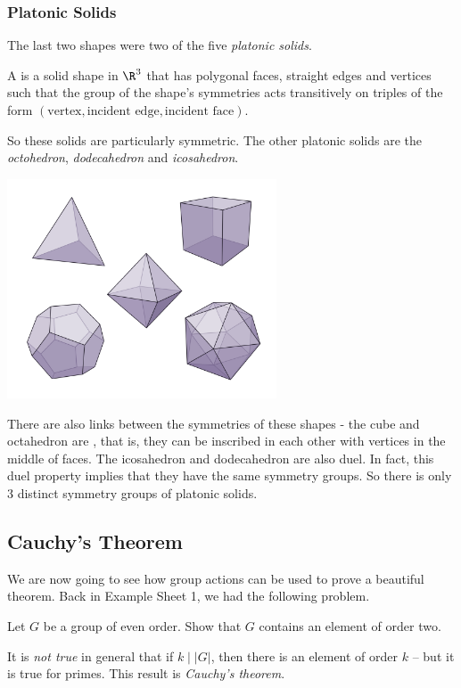 \documentclass[a4paper]{scrartcl}
\newcommand{\newsection}{\subsection}
\newcommand{\newsubsection}{\subsubsection}
\begin{document}
\newsubsection{Platonic Solids}

The last two shapes were two of the five \emph{platonic solids}.

\begin{definition}
	A  is a solid shape in $\R^3$ that has polygonal faces, straight edges and vertices such that the group of the shape's symmetries acts transitively on triples of the form $(\text{vertex}, \text{incident edge}, \text{incident face})$.
\end{definition}
So these solids are particularly symmetric. The other platonic solids are the \emph{octohedron}, \emph{dodecahedron} and \emph{icosahedron}.
\begin{center}
	\includegraphics[width=0.6\textwidth]{platonic.png}
\end{center}

There are also links between the symmetries of these shapes - the cube and octahedron are , that is, they can be inscribed in each other with vertices in the middle of faces. The icosahedron and dodecahedron are also duel. In fact, this duel property implies that they have the same symmetry groups. So there is only 3 distinct symmetry groups of platonic solids.

\newsection{Cauchy's Theorem}

We are now going to see how group actions can be used to prove a beautiful theorem. Back in Example Sheet 1, we had the following problem.

\begin{problem*}
	Let $G$ be a group of even order. Show that $G$ contains an element of order two.
\end{problem*}

It is \emph{not true} in general that if $k \mid |G|$, then there is an element of order $k$ -- but it is true for primes. This result is \emph{Cauchy's theorem}.
\end{document}
